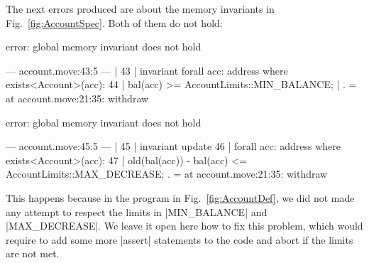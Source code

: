 The next errors produced are about the memory invariants in
Fig.~\ref{fig:AccountSpec}. Both of them do not hold:

\begin{MoveDiag}
error: global memory invariant does not hold

    --- account.move:43:5 ---
    |
 43 | invariant forall acc: address where exists<Account>(acc):
 44 |     bal(acc) >= AccountLimits::MIN_BALANCE;
    |
    .
    =     at account.move:21:35: withdraw

error: global memory invariant does not hold

    --- account.move:45:5 ---
    |
 45 | invariant update
 46 |   forall acc: address where exists<Account>(acc):
 47 |     old(bal(acc)) - bal(acc) <= AccountLimits::MAX_DECREASE;
    .
    =     at account.move:21:35: withdraw
\end{MoveDiag}

\noindent This happens because in the program in Fig.~\ref{fig:AccountDef}, we
did not made any attempt to respect the limits in |MIN_BALANCE| and
|MAX_DECREASE|. We leave it open here how to fix this problem, which would
require to add some more |assert| statements to the code and abort if the limits
are not met.


